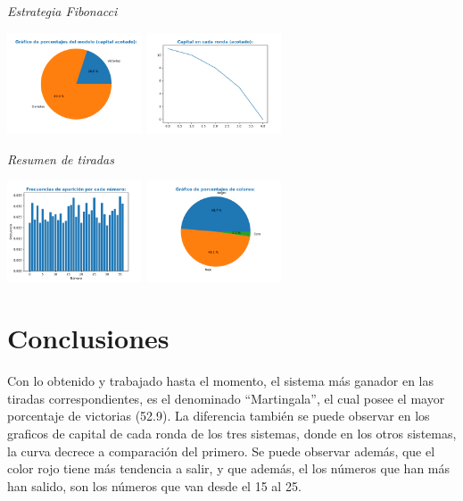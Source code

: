 \documentclass{article}
\begin{document}
    \vspace{1cm}

    {\itshape\Large Estrategia Fibonacci \par}

    \includegraphics[width=0.3\textwidth]{generated/porcentajes-fibonacci-acotado.pdf}
    \includegraphics[width=0.3\textwidth]{generated/capital-fibonacci-acotado.pdf}

    \vspace{1cm}

    {\itshape\Large Resumen de tiradas \par}
    \includegraphics[width=0.3\textwidth]{generated/frec-aparicion.pdf}
    \includegraphics[width=0.3\textwidth]{generated/resumen-colores.pdf}

    \section{Conclusiones}

    Con lo obtenido y trabajado hasta el momento,
    el sistema más ganador en las tiradas correspondientes, es el denominado ``Martingala'',
    el cual posee el mayor porcentaje de victorias (52.9).
    La diferencia también se puede observar en los graficos de capital de cada ronda de los tres sistemas, donde
    en los otros sistemas, la curva decrece a comparación del primero. Se puede observar además, que el color rojo tiene más tendencia a salir,
    y que además, el los números que han más han salido, son los números que van desde el 15 al 25.
\end{document}
